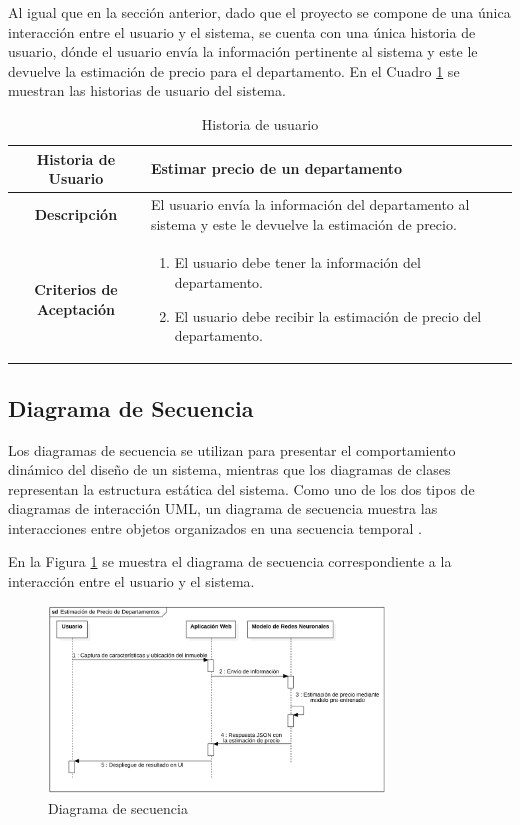 Al igual que en la sección anterior, dado que el
proyecto se compone de una única interacción entre el usuario y el sistema,
se cuenta con una única historia de usuario, dónde el usuario envía la
información pertinente al sistema y este le devuelve la estimación de precio
para el departamento.  En el Cuadro \ref{tab:historias_de_usuario} se
muestran las historias de usuario del sistema.

\begin{table}[H]
    \centering
    \begin{tabular}{|c|p{}|}
        \hline
        \textbf{Historia de Usuario} & Estimar precio de un departamento \\
        \hline
        \textbf{Descripción} & El usuario envía la información del
        departamento al sistema y este le devuelve la estimación de precio. \\
        \hline
        \textbf{Criterios de Aceptación} & \begin{enumerate}
            \item El usuario debe tener la información del departamento.
            \item El usuario debe recibir la estimación de precio del
            departamento.
        \end{enumerate} \\
        \hline
    \end{tabular}
    \caption{Historia de usuario}
    \label{tab:historias_de_usuario}
\end{table}

\subsection{Diagrama de Secuencia}

Los diagramas de secuencia se utilizan para presentar el comportamiento dinámico
del diseño de un sistema, mientras que los diagramas de clases representan la
estructura estática del sistema. Como uno de los dos tipos de diagramas de
interacción UML, un diagrama de secuencia muestra las interacciones entre
objetos organizados en una secuencia temporal \cite{1290469}.

En la Figura \ref{fig:diagrama_de_secuencia} se muestra el diagrama de
secuencia correspondiente a la interacción entre el usuario y el sistema.

\begin{figure}[H]
    \centering
    \includegraphics[width=0.8\textwidth]{imagenes/04-diseno/secuencia.png}
    \caption{Diagrama de secuencia}
    \label{fig:diagrama_de_secuencia}
\end{figure}

